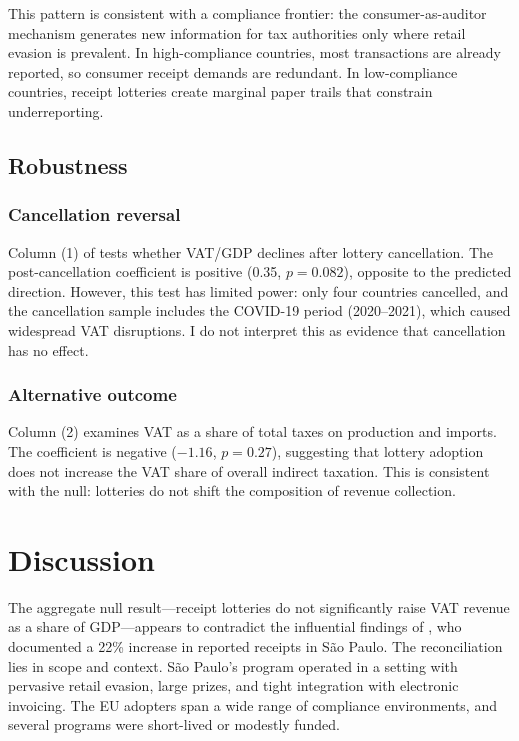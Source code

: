 \documentclass[12pt]{article}
\begin{document}
This pattern is consistent with a compliance frontier: the consumer-as-auditor mechanism generates new information for tax authorities only where retail evasion is prevalent. In high-compliance countries, most transactions are already reported, so consumer receipt demands are redundant. In low-compliance countries, receipt lotteries create marginal paper trails that constrain underreporting.

\subsection{Robustness}

\subsubsection*{Cancellation reversal} Column (1) of  tests whether VAT/GDP declines after lottery cancellation. The post-cancellation coefficient is positive (0.35, $p = 0.082$), opposite to the predicted direction. However, this test has limited power: only four countries cancelled, and the cancellation sample includes the COVID-19 period (2020--2021), which caused widespread VAT disruptions. I do not interpret this as evidence that cancellation has no effect.

\subsubsection*{Alternative outcome} Column (2) examines VAT as a share of total taxes on production and imports. The coefficient is negative ($-1.16$, $p = 0.27$), suggesting that lottery adoption does not increase the VAT share of overall indirect taxation. This is consistent with the null: lotteries do not shift the composition of revenue collection.


\section{Discussion}

The aggregate null result---receipt lotteries do not significantly raise VAT revenue as a share of GDP---appears to contradict the influential findings of \citet{Naritomi2019}, who documented a 22\% increase in reported receipts in S\~{a}o Paulo. The reconciliation lies in scope and context. S\~{a}o Paulo's program operated in a setting with pervasive retail evasion, large prizes, and tight integration with electronic invoicing. The EU adopters span a wide range of compliance environments, and several programs were short-lived or modestly funded.
\end{document}
